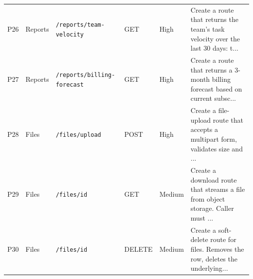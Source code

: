 \begin{table}[htbp]
{\begin{tabular}{llllll}
P26 & Reports & \texttt{/reports/team-velocity} & GET & High & Create a route that returns the team's task velocity over the last 30 days: t... \\
P27 & Reports & \texttt{/reports/billing-forecast} & GET & High & Create a route that returns a 3-month billing forecast based on current subsc... \\
P28 & Files & \texttt{/files/upload} & POST & High & Create a file-upload route that accepts a multipart form, validates size and ... \\
P29 & Files & \texttt{/files/\:id} & GET & Medium & Create a download route that streams a file from object storage. Caller must ... \\
P30 & Files & \texttt{/files/\:id} & DELETE & Medium & Create a soft-delete route for files. Removes the row, deletes the underlying... \\
\bottomrule
\end{tabular}
}
\end{table}

\begin{table}[htbp]
\centering
\caption{Specifications and execution environment characteristics of the evaluated large language models (LLMs), ordered by parameter scale descending.}
\label{tab:models}
\end{table}

